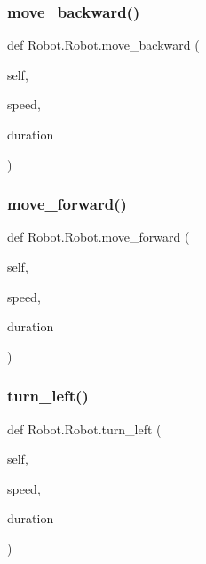 \subsubsection{\texorpdfstring{move\+\_\+backward()}{move\_backward()}}
{\footnotesize\ttfamily def Robot.\+Robot.\+move\+\_\+backward (\begin{DoxyParamCaption}\item[{}]{self,  }\item[{}]{speed,  }\item[{}]{duration }\end{DoxyParamCaption})}

\mbox{\label{class_robot_1_1_robot_ab1a6040ab6b4bde8fd8230b6f84cd8c8}} 
\subsubsection{\texorpdfstring{move\+\_\+forward()}{move\_forward()}}
{\footnotesize\ttfamily def Robot.\+Robot.\+move\+\_\+forward (\begin{DoxyParamCaption}\item[{}]{self,  }\item[{}]{speed,  }\item[{}]{duration }\end{DoxyParamCaption})}

\mbox{\label{class_robot_1_1_robot_aeb19d8722b14e591d980f44887f5430b}} 
\subsubsection{\texorpdfstring{turn\+\_\+left()}{turn\_left()}}
{\footnotesize\ttfamily def Robot.\+Robot.\+turn\+\_\+left (\begin{DoxyParamCaption}\item[{}]{self,  }\item[{}]{speed,  }\item[{}]{duration }\end{DoxyParamCaption})}

\mbox{\label{class_robot_1_1_robot_afd3797d558dd232b5c57ff1d2997024c}} 

